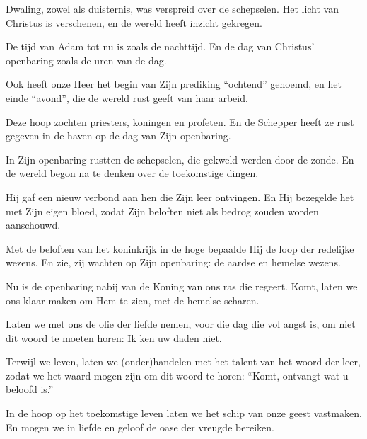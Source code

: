 \documentclass[12pt,twoside,a5paper]{article}
\begin{document}

\begin{halfparskip}

  Dwaling, zowel als duisternis, was verspreid over de schepselen. Het licht van Christus is verschenen, en de wereld heeft inzicht gekregen.

  De tijd van Adam tot nu is zoals de nachttijd. En de dag van Christus' openbaring zoals de uren van de dag.

  Ook heeft onze Heer het begin van Zijn prediking ``ochtend'' genoemd, en het einde ``avond'', die de wereld rust geeft van haar arbeid.

  Deze hoop zochten priesters, koningen en profeten. En de Schepper heeft ze rust gegeven in de haven op de dag van Zijn openbaring.

  In Zijn openbaring rustten de schepselen, die gekweld werden door de zonde. En de wereld begon na te denken over de toekomstige dingen.

  Hij gaf een nieuw verbond aan hen die Zijn leer ontvingen. En Hij bezegelde het met Zijn eigen bloed, zodat Zijn beloften niet als bedrog zouden worden aanschouwd.

  Met de beloften van het koninkrijk in de hoge bepaalde Hij de loop der redelijke wezens. En zie, zij wachten op Zijn openbaring: de aardse en hemelse wezens.

  Nu is de openbaring nabij van de Koning van ons ras die regeert. Komt, laten we ons klaar maken om Hem te zien, met de hemelse scharen.

  Laten we met ons de olie der liefde nemen, voor die dag die vol angst is, om niet dit woord te moeten horen: Ik ken uw daden niet.

  Terwijl we leven, laten we (onder)handelen met het talent van het woord der leer, zodat we het waard mogen zijn om dit woord te horen: ``Komt, ontvangt wat u beloofd is.''

  In de hoop op het toekomstige leven laten we het schip van onze geest vastmaken. En mogen we in liefde en geloof de oase der vreugde bereiken.
\end{halfparskip}
\end{document}
